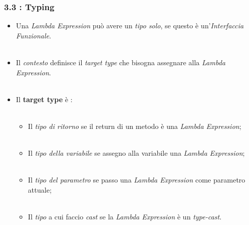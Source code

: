 \documentclass{beamer}
\begin{document}

\begin{frame}
	\frametitle{\textbf{3.3 : Typing}}
	\begin{itemize}
		\item
			Una \textit{Lambda Expression} può avere un \textit{tipo solo}, se questo è un'\textit{Interfaccia Funzionale}.\\\
		\item
			Il \textit{contesto} definisce il \textit{target type} che bisogna assegnare alla \textit{Lambda Expression}.\\\
		\item
			Il \textbf{target type} è :\\\
			\begin{itemize}
				\item
					Il \textit{tipo di ritorno} se il return di un metodo è una \textit{Lambda Expression};\\\
				\item
					Il \textit{tipo della variabile} se assegno alla variabile una \textit{Lambda Expression};\\\
				\item
					Il \textit{tipo del parametro} se passo una \textit{Lambda Expression} come parametro attuale;\\\
				\item
					Il \textit{tipo} a cui faccio \textit{cast} se la \textit{Lambda Expression} è un \textit{type-cast}.
			\end{itemize}
	\end{itemize}
\end{frame}

\end{document}
